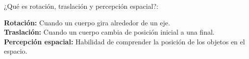 
\question ¿Qué es rotación, traslación y percepción espacial?:
  \begin{solution}[4cm]
    \textbf{Rotación:} Cuando un cuerpo gira alrededor de un eje. \\
    \textbf{Traslación:} Cuando un cuerpo cambia de posición inicial a una
                         final. \\
    \textbf{Percepción espacial:} Habilidad de comprender la posición de los
                                  objetos en el espacio.
  \vspace{1cm}
  \end{solution}
